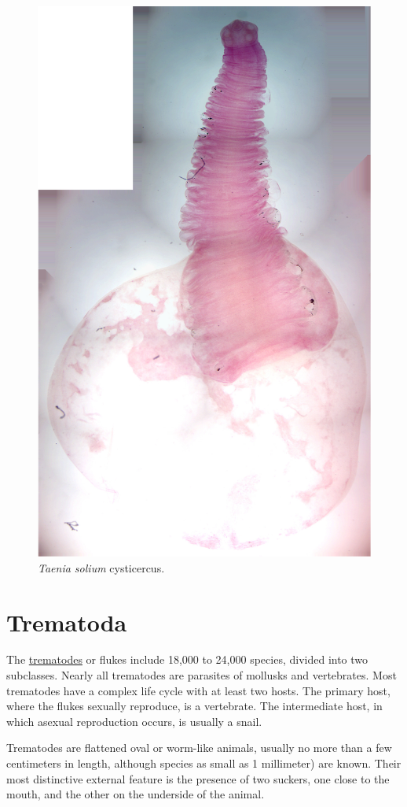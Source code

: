 \begin{figure}

{\centering \includegraphics[width=0.7\linewidth]{./figures/rotifera/taenia_solium_cysticercus}

}

\caption{\emph{Taenia solium} cysticercus.}\label{fig:cysticercus}
\end{figure}

\section{Trematoda}\label{trematoda}

The \href{https://en.wikipedia.org/wiki/Trematoda}{trematodes} or flukes
include 18,000 to 24,000 species, divided into two subclasses. Nearly
all trematodes are parasites of mollusks and vertebrates. Most
trematodes have a complex life cycle with at least two hosts. The
primary host, where the flukes sexually reproduce, is a vertebrate. The
intermediate host, in which asexual reproduction occurs, is usually a
snail.

Trematodes are flattened oval or worm-like animals, usually no more than
a few centimeters in length, although species as small as 1 millimeter)
are known. Their most distinctive external feature is the presence of
two suckers, one close to the mouth, and the other on the underside of
the animal.

